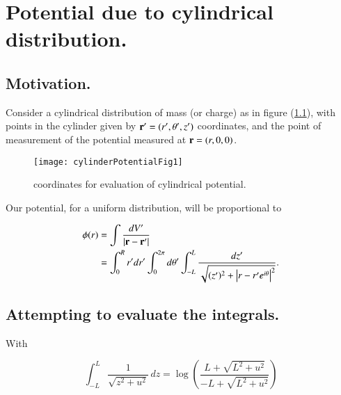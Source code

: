 %
%

\chapter{Potential due to cylindrical distribution.}
\label{chap:cylinderPotential}
{}
\date{Feb 27, 2012}

\beginArtWithToc

\section{Motivation.}

Consider a cylindrical distribution of mass (or charge) as in figure (\ref{fig:cylinderPotential:cylinderPotentialFig1}), with points in the cylinder given  by $\mathbf{r}' = (r', \theta ', z')$ coordinates, and the point of measurement of the potential measured at $\mathbf{r} = (r, 0, 0)$.

\begin{figure}[htp]
   \centering
   \texttt{[image: cylinderPotentialFig1]}
   \caption{coordinates for evaluation of cylindrical potential.}\label{fig:cylinderPotential:cylinderPotentialFig1}
\end{figure}

Our potential, for a uniform distribution, will be proportional to

\begin{equation}\label{eqn:cylinderPotential:10}
\begin{aligned}
\phi(r) 
&= \int \frac{ dV'}{\left\lvert{\mathbf{r}- \mathbf{r}'}\right\rvert} \\
&=
\int_0^R r' dr' \int_0^{2 \pi } d\theta' \int_{-L}^L \frac{dz' }{\sqrt{(z')^2+ \left\lvert{r - r' e^{i \theta }}\right\rvert^2}}.
\end{aligned}
\end{equation}

\section{Attempting to evaluate the integrals.}

With

\begin{equation}\label{eqn:cylinderPotential:30}
\int_{-L}^L \frac{1}{\sqrt{z^2+u^2}} \, dz=\log \left(\frac{L+\sqrt{L^2+u^2}}{-L+\sqrt{L^2+u^2}}\right)
\end{equation}

